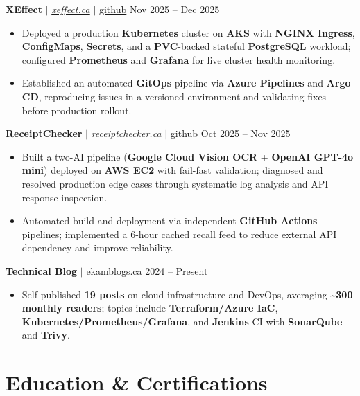 \documentclass[11pt,a4paper]{article}
\begin{document}
\textbf{XEffect} $|$ \href{https://www.xeffect.ca/app}{\emph{xeffect.ca}} $|$ \href{https://github.com/bhat0155/xeffect}{\small github} \hfill Nov 2025 -- Dec 2025
\begin{itemize}
    \item Deployed a production \textbf{Kubernetes} cluster on \textbf{AKS} with \textbf{NGINX Ingress}, \textbf{ConfigMaps}, \textbf{Secrets}, and a \textbf{PVC}-backed stateful \textbf{PostgreSQL} workload; configured \textbf{Prometheus} and \textbf{Grafana} for live cluster health monitoring.
    \item Established an automated \textbf{GitOps} pipeline via \textbf{Azure Pipelines} and \textbf{Argo CD}, reproducing issues in a versioned environment and validating fixes before production rollout.
\end{itemize}

\vspace{4pt}

\textbf{ReceiptChecker} $|$ \href{https://receiptchecker.ca/}{\emph{receiptchecker.ca}} $|$ \href{https://github.com/bhat0155/receipt-check}{\small github} \hfill Oct 2025 -- Nov 2025
\begin{itemize}
    \item Built a two-AI pipeline (\textbf{Google Cloud Vision OCR} + \textbf{OpenAI GPT-4o mini}) deployed on \textbf{AWS EC2} with fail-fast validation; diagnosed and resolved production edge cases through systematic log analysis and API response inspection.
    \item Automated build and deployment via independent \textbf{GitHub Actions} pipelines; implemented a 6-hour cached recall feed to reduce external API dependency and improve reliability.
\end{itemize}

\vspace{4pt}

\textbf{Technical Blog} $|$ \href{https://www.ekamblogs.ca}{ekamblogs.ca} \hfill 2024 -- Present
\begin{itemize}
    \item Self-published \textbf{19 posts} on cloud infrastructure and DevOps, averaging \textasciitilde\textbf{300 monthly readers}; topics include \textbf{Terraform/Azure IaC}, \textbf{Kubernetes/Prometheus/Grafana}, and \textbf{Jenkins} CI with \textbf{SonarQube} and \textbf{Trivy}.
\end{itemize}

\section{Education \& Certifications}
\end{document}
